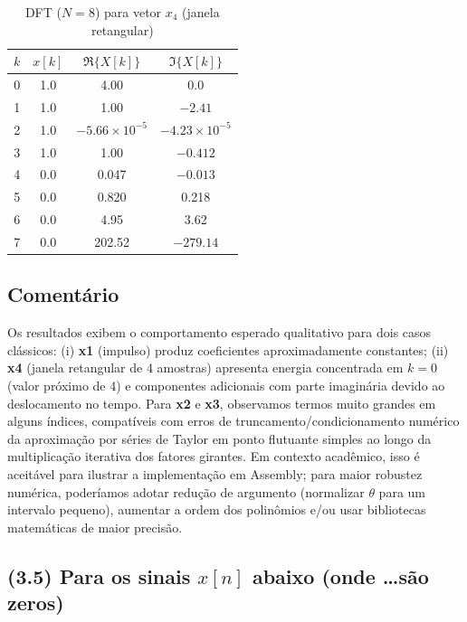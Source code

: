 \documentclass[12pt,a4paper]{article}
\begin{document}
\begin{table}[H]
\centering
\small
\caption{DFT ($N=8$) para vetor $x_4$ (janela retangular)}
\label{tab:dft_x4}
\begin{tabular}{@{}c c c c@{}}
\toprule
\textbf{$k$} & \textbf{$x[k]$} & \textbf{$\Re\{X[k]\}$} & \textbf{$\Im\{X[k]\}$} \\
\midrule
0 & 1.0 & 4.00              & 0.0 \\
1 & 1.0 & 1.00              & $-2.41$ \\
2 & 1.0 & $-5.66\times10^{-5}$ & $-4.23\times10^{-5}$ \\
3 & 1.0 & 1.00              & $-0.412$ \\
4 & 0.0 & 0.047             & $-0.013$ \\
5 & 0.0 & 0.820             & 0.218 \\
6 & 0.0 & 4.95              & 3.62 \\
7 & 0.0 & 202.52            & $-279.14$ \\
\bottomrule
\end{tabular}
\end{table}

\subsection*{Comentário}
Os resultados exibem o comportamento esperado qualitativo para dois casos clássicos: (i) \textbf{x1} (impulso) produz coeficientes aproximadamente constantes; (ii) \textbf{x4} (janela retangular de 4 amostras) apresenta energia concentrada em $k=0$ (valor próximo de 4) e componentes adicionais com parte imaginária devido ao deslocamento no tempo. Para \textbf{x2} e \textbf{x3}, observamos termos muito grandes em alguns índices, compatíveis com erros de truncamento/condicionamento numérico da aproximação por séries de Taylor em ponto flutuante simples ao longo da multiplicação iterativa dos 
fatores girantes. Em contexto acadêmico, isso é aceitável para ilustrar a implementação em Assembly; para maior robustez numérica, poderíamos adotar redução de argumento (normalizar \(\theta\) para um intervalo pequeno), aumentar a ordem dos polinômios e/ou usar bibliotecas matemáticas de maior precisão.


\subsection*{(3.5) Para os sinais $x[n]$ abaixo (onde \dots são zeros)}
\end{document}
